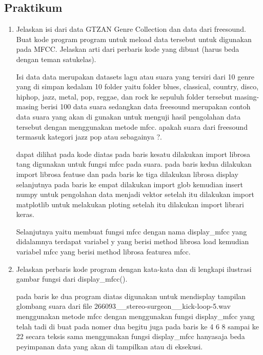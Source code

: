 \subsection{Praktikum}
\begin{enumerate}
\item Jelaskan isi dari data GTZAN Genre Collection dan data dari freesound. Buat kode program program untuk meload data tersebut untuk digunakan pada MFCC. Jelaskan arti dari perbaris kode yang dibuat (harus beda dengan teman satukelas).\par
\subitem Isi data data merupakan datasets lagu atau suara yang tersiri dari 10 genre yang di simpan kedalam 10 folder yaitu folder blues, classical, country, disco, hiphop, jazz, metal, pop, reggae, dan rock ke sepuluh folder tersebut masing-masing berisi 100 data suara sedangkan data freesound merupakan contoh data suara yang akan di gunakan untuk menguji hasil pengolahan data tersebut dengan menggunakan metode mfcc. apakah suara dari freesound termasuk kategori jazz pop atau sebagainya ?.



\subitem dapat dilihat pada kode diatas pada baris kesatu dilakukan import librosa tang digunakan untuk fungsi mfcc pada suara.
pada baris kedua dilakukan import librosa featuse dan pada baris ke tiga dilakukan librosa display selanjutnya pada baris ke empat dilakukan import glob kemudian insert numpy untuk pengolahan data menjadi vektor setelah itu dilakukan import matplotlib untuk melakukan ploting setelah itu dilakukan import librari keras.\par

\subitem Selanjutnya yaitu membuat fungsi mfcc dengan nama display\_mfcc yang didalamnya terdapat variabel y yang berisi method librosa load kemudian variabel mfcc yang berisi method librosa featurea mfcc.

\item Jelaskan perbaris kode program dengan kata-kata dan di lengkapi ilustrasi gambar fungsi dari display\_mfcc().\par



\subitem pada baris ke dua program diatas digunakan untuk mendisplay tampilan glombang suara dari file 266093\_\_stereo-surgeon\_\_kick-loop-5.wav menggunakan metode mfcc dengan menggunakan fungsi display\_mfcc yang telah tadi di buat pada nomer dua begitu juga pada baris ke 4 6 8 sampai ke 22 secara teksis sama menggunakan fungsi display\_mfcc hanyasaja beda peyimpanan data yang akan di tampilkan atau di eksekusi.



\end{enumerate}
